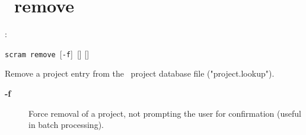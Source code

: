 \section{\scram\ remove}

\cmdintro:

\hspace{5mm}\texttt{scram}~\texttt{remove}~[\texttt{-f}]~[] []

\ni Remove a project entry from the \scram\ project database file ("project.lookup").
\begin{description}
\item[\textbf{-f}]
  Force removal of a project, not prompting the user for confirmation (useful in batch processing).
\end{description}



